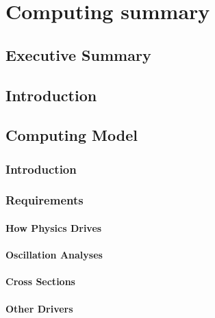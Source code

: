 \chapter{Computing summary}
\label{ch:exec-comp}

\section{Executive Summary}		
\label{ch:exec-comp-es}

\section{Introduction}		
\label{ch:exec-comp-int}
\section{Computing Model}		
\label{ch:exec-comp-mod}

\subsection{Introduction}	
\label{ch:exec-comp-mod-int}


\subsection{Requirements}	
\label{ch:exec-comp-mod-req}


\subsubsection{How Physics Drives}
\label{ch:exec-comp-mod-req-phys-drv}


\subsubsection{Oscillation Analyses}
\label{ch:exec-comp-mod-req-osc}


\subsubsection{Cross Sections}
\label{ch:exec-comp-mod-req-xsec}


\subsubsection{Other Drivers}
\label{ch:exec-comp-mod-req-oth-drv}


